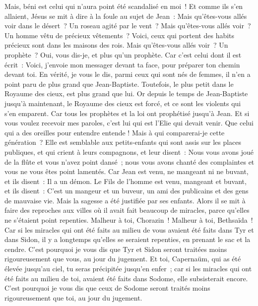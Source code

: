 \begin{multicols}{2}
Mais, béni est celui qui n'aura point été scandalisé en moi~!
Et comme ils s'en allaient, Jésus se mit à dire à la foule au sujet de Jean~: Mais qu'êtes-vous allés voir dans le désert~? Un roseau agité par le vent~?
Mais qu'êtes-vous allés voir~? Un homme vêtu de précieux vêtements~? Voici, ceux qui portent des habits précieux sont dans les maisons des rois.
Mais qu'êtes-vous allés voir~? Un prophète~? Oui, vous dis-je, et plus qu'un prophète.
Car c'est celui dont il est écrit~: Voici, j'envoie mon messager devant ta face, pour préparer ton chemin devant toi.
En vérité, je vous le dis, parmi ceux qui sont nés de femmes, il n'en a point paru de plus grand que Jean-Baptiste. Toutefois, le plus petit dans le Royaume des cieux, est plus grand que lui.
Or depuis le temps de Jean-Baptiste jusqu'à maintenant, le Royaume des cieux est forcé, et ce sont les violents qui s'en emparent.
Car tous les prophètes et la loi ont prophétisé jusqu'à Jean.
Et si vous voulez recevoir mes paroles, c'est lui qui est l'Elie qui devait venir.
Que celui qui a des oreilles pour entendre entende !
Mais à qui comparerai-je cette génération~? Elle est semblable aux petits-enfants qui sont assis sur les places publiques, et qui crient à leurs compagnons,
et leur disent~: Nous vous avons joué de la flûte et vous n'avez point dansé~; nous vous avons chanté des complaintes et vous ne vous êtes point lamentés.
Car Jean est venu, ne mangeant ni ne buvant, et ils disent~: Il a un démon.
Le Fils de l'homme est venu, mangeant et buvant, et ils disent~: C'est un mangeur et un buveur, un ami des publicains et des gens de mauvaise vie. Mais la sagesse a été justifiée par ses enfants.
Alors il se mit à faire des reproches aux villes où il avait fait beaucoup de miracles, parce qu'elles ne s'étaient point repenties.
Malheur à toi, Chorazin~! Malheur à toi, Bethsaïda~! Car si les miracles qui ont été faits au milieu de vous avaient été faits dans Tyr et dans Sidon, il y a longtemps qu'elles se seraient repenties, en prenant le sac et la cendre.
C'est pourquoi je vous dis que Tyr et Sidon seront traitées moins rigoureusement que vous, au jour du jugement.
Et toi, Capernaüm, qui as été élevée jusqu'au ciel, tu seras précipitée jusqu'en enfer~; car si les miracles qui ont été faits au milieu de toi, avaient été faits dans Sodome, elle subsisterait encore.
C'est pourquoi je vous dis que ceux de Sodome seront traités moins rigoureusement que toi, au jour du jugement.

\end{multicols}
